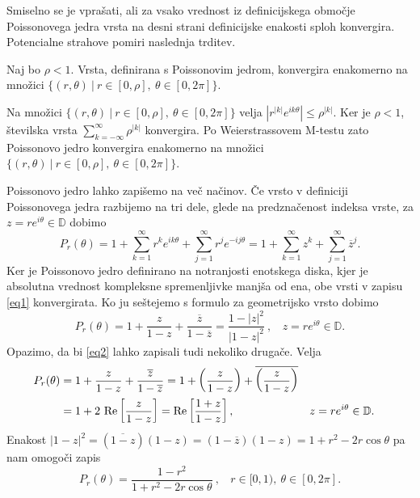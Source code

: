 \documentclass[mat1, tisk]{fmfdelo}
\begin{document}
    Smiselno se je vprašati, ali za vsako vrednost iz definicijskega območje Poissonovega jedra vrsta na desni strani definicijske enakosti sploh konvergira. Potencialne strahove pomiri naslednja trditev.
    
    \begin{trditev}
        Naj bo $\rho < 1$. Vrsta, definirana s Poissonovim jedrom, konvergira enakomerno na množici $\{(r,\theta)~|~r \in [0,\rho],~ \theta \in [0,2\pi]\}$.
    \end{trditev}
    \begin{dokaz}
        Na množici $\{(r,\theta)~|~r \in [0,\rho],~ \theta \in [0,2\pi]\}$ velja $|r^{|k|} e^{i k \theta}| \leq \rho^{|k|}$. Ker je $\rho < 1$, številska vrsta $\sum_{k = -\infty}^{\infty}{\rho ^{|k|}}$ konvergira. 
        Po Weierstrassovem M-testu zato Poissonovo jedro konvergira enakomerno na množici $\{(r,\theta)~|~r \in [0,\rho],~ \theta \in [0,2\pi]\}$.
    \end{dokaz}

    Poissonovo jedro lahko zapišemo na več načinov. Če vrsto v definiciji Poissonovega jedra razbijemo na tri dele, glede na predznačenost indeksa vrste, za $z = r e^{i\theta} \in \mathbb{D}$ dobimo
    \begin{equation}
        \label{eq1}
        P_r(\theta) =  1 + \sum_{k = 1}^{\infty}{r^{k} e^{i k \theta}} +  \sum_{j = 1}^{\infty}{r^{j} e^{-i j \theta}}  = 1 + \sum_{k=1}^{\infty}{z^k} + \sum_{j=1}^{\infty}{\overline{z}^{j}}.
    \end{equation}
    Ker je Poissonovo jedro definirano na notranjosti enotskega diska, kjer je absolutna vrednost kompleksne spremenljivke manjša od ena, obe vrsti v zapisu \eqref{eq1} konvergirata.
    Ko ju seštejemo s formulo za geometrijsko vrsto dobimo
    \begin{equation}
        \label{eq2}
        P_r(\theta) = 1 + \frac{z}{1 - z}+ \frac{\overline{z}}{1 - \overline{z}} = \frac{1 - |z|^2}{|1-z|^2}~,~~~~z = r e^{i\theta} \in \mathbb{D}.
    \end{equation}
    Opazimo, da bi \eqref{eq2} lahko zapisali tudi nekoliko drugače. Velja
    \begin{align}
        \label{eq3}
        P_r(\theta) &= 1 + \frac{z}{1 - z}+ \frac{\overline{z}}{1 - \overline{z}} = 1 + \left(\frac{z}{1 - z} \right)+ \overline{\left(\frac{z}{1 - z}\right)} \notag \\
        &= 1 + 2~\text{Re}\left[\frac{z}{1-z}\right] =\text{Re}\left[\frac{1 + z}{1-z}\right], & &z = r e^{i\theta} \in \mathbb{D}.
    \end{align}
    Enakost $|1 - z|^2 = (\overline{1 - z})(1 - z) = (1 - \overline{z})(1 - z) = 1 + r^2 - 2r \cos\theta$ pa nam omogoči zapis
    \begin{equation}
        \label{eq4}
        P_r(\theta) = \frac{1-r^2}{1+ r^2 - 2r \cos\theta}~,~~~~r \in [0,1),~\theta \in [0,2\pi].
    \end{equation}
\end{document}
